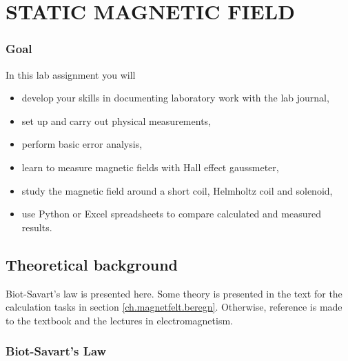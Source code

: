 \documentclass[../Elmag-labhefte-2020.tex]{subfiles}
\begin{document}
\setchapterpreamble[u]{\margintoc}
\chapter{STATIC MAGNETIC FIELD \label{ch.magnetfelt}}

\subsection*{Goal}

In this lab assignment you will
%
\begin{itemize}
    \item develop your skills in documenting laboratory work with the lab journal,
    \item set up and carry out physical measurements,
    \item perform basic error analysis,
    \item learn to measure magnetic fields with Hall effect gaussmeter,
    \item study the magnetic field around a short coil, Helmholtz coil and solenoid,
    \item use Python or Excel spreadsheets to compare calculated and measured results.
\end{itemize}
%

\section{Theoretical background}

Biot-Savart's law is presented here. Some theory is presented in the text for the calculation tasks in section \ref{ch.magnetfelt.beregn}. Otherwise, reference is made to the textbook and the lectures in electromagnetism.

\subsection{Biot-Savart's Law}
\end{document}
